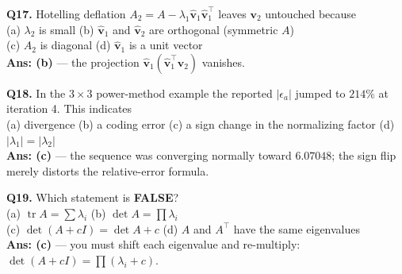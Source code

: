 \begin{mcqbox}
\textbf{Q17.} Hotelling deflation $A_2 = A-\lambda_1\hat{\mathbf v}_1\hat{\mathbf v}_1^\top$ leaves $\mathbf v_2$ untouched because\\
(a) $\lambda_2$ is small \quad (b) $\hat{\mathbf v}_1$ and $\hat{\mathbf v}_2$ are orthogonal (symmetric $A$)\\
(c) $A_2$ is diagonal \quad (d) $\hat{\mathbf v}_1$ is a unit vector\\
\textbf{Ans: (b)} --- the projection $\hat{\mathbf v}_1(\hat{\mathbf v}_1^\top\mathbf v_2)$ vanishes.

\textbf{Q18.} In the $3\times3$ power-method example the reported $|\epsilon_a|$ jumped to $214\%$ at iteration 4. This indicates\\
(a) divergence \quad (b) a coding error \quad (c) a sign change in the normalizing factor \quad (d) $|\lambda_1| = |\lambda_2|$\\
\textbf{Ans: (c)} --- the sequence was converging normally toward $6.07048$; the sign flip merely distorts the relative-error formula.

\textbf{Q19.} Which statement is \textbf{FALSE}?\\
(a) $\operatorname{tr}A = \sum\lambda_i$ \quad (b) $\det A = \prod\lambda_i$\\
(c) $\det(A+cI) = \det A + c$ \quad (d) $A$ and $A^\top$ have the same eigenvalues\\
\textbf{Ans: (c)} --- you must shift each eigenvalue and re-multiply: $\det(A+cI) = \prod(\lambda_i+c)$.
\end{mcqbox}

